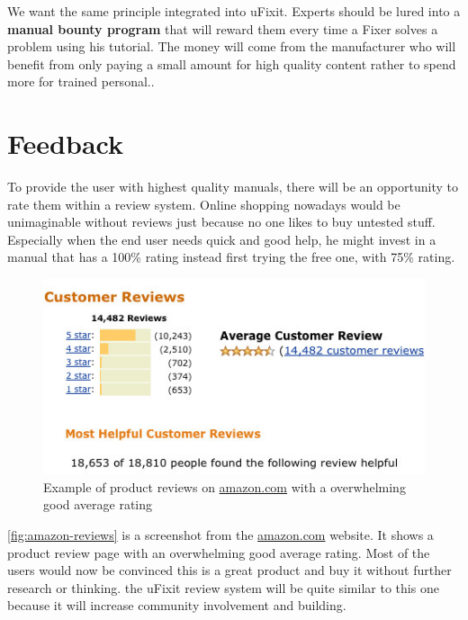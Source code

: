 		We want the same principle integrated into uFixit. Experts should be lured into a \textbf{manual bounty program} that will reward them every time a Fixer solves a problem using his tutorial. The money will come from the manufacturer who will benefit from only paying a small amount for high quality content rather to spend more for trained personal..
	
	\section{Feedback}
	
		To provide the user with highest quality manuals, there will be an opportunity to rate them within a review system. Online shopping nowadays would be unimaginable without reviews just because no one likes to buy untested stuff. Especially when the end user needs quick and good help, he might invest in a manual that has a 100\% rating instead first trying the free one, with 75\% rating.

		\begin{figure}[H]
			\centering
			\includegraphics[width=0.7\linewidth]{../images/how-to-get-amazon-reviews-kindle.jpg}
			\caption{Example of product reviews on \url{amazon.com} with a overwhelming good average rating}
			\label{fig:amazon-reviews}
		\end{figure}
		
		\autoref{fig:amazon-reviews} is a screenshot from the \url{amazon.com} website. It shows a product review page with an overwhelming good average rating. Most of the users would now be convinced this is a great product and buy it without further research or thinking. the uFixit review system will be quite similar to this one because it will increase community involvement and building.
